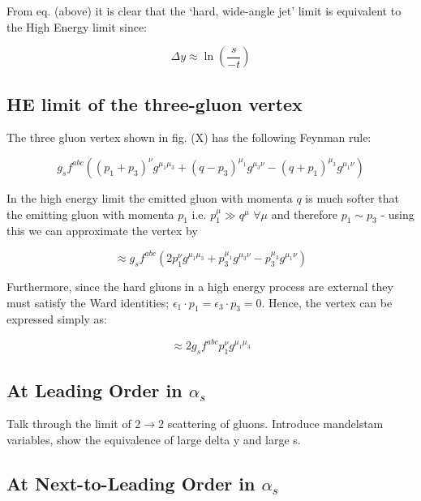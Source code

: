 		From eq. (above) it is clear that the `hard, wide-angle jet' limit is equivalent to the High Energy limit since:

		\begin{equation}
			\Delta y \approx \ln \left(\frac{s}{-t}\right)
		\end{equation}

	\subsection{HE limit of the three-gluon vertex}
	\label{sub:subsection_name}

		The three gluon vertex shown in fig. (X) has the following Feynman rule:

		\begin{equation}
			g_s f^{abc} \left((p_1+p_3)^\nu g^{\mu_1\mu_3} + (q-p_3)^{\mu_1}g^{\mu_3\nu} - (q+p_1)^{\mu_3}g^{\mu_1\nu}\right)
		\end{equation}

		In the high energy limit the emitted gluon with momenta $q$ is much softer that the emitting gluon with momenta $p_1$ i.e. $p_1^\mu \gg q^\mu$  $\forall \mu$ and therefore $p_1\sim p_3$ - using this we can approximate the vertex by

		\begin{equation}
			\approx g_s f^{abc} \left(2p_1^\nu g^{\mu_1\mu_3} + p_3^{\mu_1}g^{\mu_3\nu} - p_3^{\mu_3}g^{\mu_1\nu}\right)
		\end{equation}

		Furthermore, since the hard gluons in a high energy process are external they must satisfy the Ward identities; $\epsilon_1\cdot p_1 = \epsilon_3\cdot p_3 = 0$.  Hence, the vertex can be expressed simply as:

		\begin{equation}
			\approx 2g_s f^{abc}p_1^\nu g^{\mu_1\mu_3}
		\end{equation}

	\subsection{At Leading Order in $\alpha_s$}
	\label{sub:HE22_LO}

		Talk through the limit of $2\rightarrow2$ scattering of gluons.  Introduce mandelstam variables, show the equivalence of large delta y and large s.

	\subsection{At Next-to-Leading Order in $\alpha_s$}
	\label{sub:HE22_NLO}

